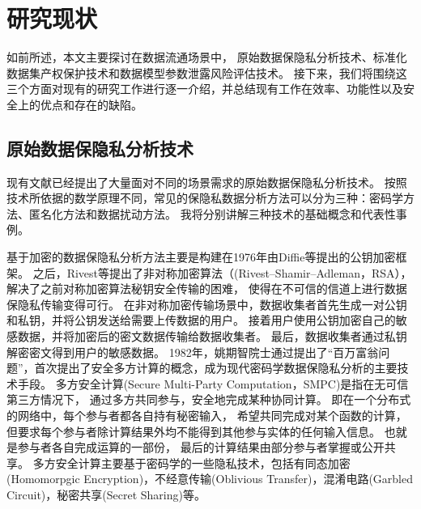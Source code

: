 \section{研究现状}
如前所述，本文主要探讨在数据流通场景中，
原始数据保隐私分析技术、标准化数据集产权保护技术和数据模型参数泄露风险评估技术。
接下来，我们将围绕这三个方面对现有的研究工作进行逐一介绍，并总结现有工作在效率、功能性以及安全上的优点和存在的缺陷。

\subsection{原始数据保隐私分析技术}
现有文献已经提出了大量面对不同的场景需求的原始数据保隐私分析技术。
按照技术所依据的数学原理不同，常见的保隐私数据分析方法可以分为三种：密码学方法、匿名化方法和数据扰动方法。
我将分别讲解三种技术的基础概念和代表性事例。

基于加密的数据保隐私分析方法主要是构建在1976年由Diffie等提出的公钥加密框架\cite{DBLP:journals/tit/DiffieH76}。
之后，Rivest等提出了非对称加密算法（(Rivest–Shamir–Adleman，RSA），
解决了之前对称加密算法秘钥安全传输的困难\cite{DBLP:journals/cacm/RivestSA78}，
使得在不可信的信道上进行数据保隐私传输变得可行。
在非对称加密传输场景中，数据收集者首先生成一对公钥和私钥，并将公钥发送给需要上传数据的用户。
接着用户使用公钥加密自己的敏感数据，并将加密后的密文数据传输给数据收集者。
最后，数据收集者通过私钥解密密文得到用户的敏感数据。
1982年，姚期智院士通过提出了“百万富翁问题”，首次提出了安全多方计算的概念\cite{DBLP:conf/focs/Yao82b}，成为现代密码学数据保隐私分析的主要技术手段。
多方安全计算(Secure Multi-Party Computation，SMPC)是指在无可信第三方情况下，
通过多方共同参与，安全地完成某种协同计算。
即在一个分布式的网络中，每个参与者都各自持有秘密输入，
希望共同完成对某个函数的计算，但要求每个参与者除计算结果外均不能得到其他参与实体的任何输入信息。
也就是参与者各自完成运算的一部份，
最后的计算结果由部分参与者掌握或公开共享。
多方安全计算主要基于密码学的一些隐私技术，包括有同态加密(Homomorpgic Encryption)\cite{rivest1978data}，不经意传输(Oblivious Transfer)\cite{DBLP:journals/iacr/Rabin05}，混淆电路(Garbled Circuit)\cite{DBLP:conf/focs/Yao86}，秘密共享(Secret Sharing)\cite{DBLP:journals/cacm/Shamir79, DBLP:conf/mark2/Blakley79}等。

